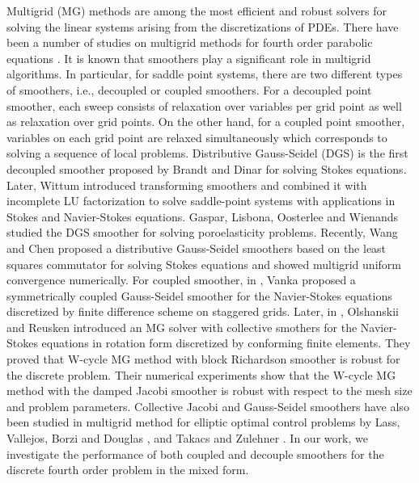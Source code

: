 \documentclass[smallcondensed]{svjour3}
\numberwithin{equation}{section} \numberwithin{table}{section}
\numberwithin{figure}{section}
\numberwithin{algorithm}{section}
\begin{document}
Multigrid (MG) methods are among the most efficient and robust solvers for solving the linear systems arising from the discretizations of PDEs. There have been a number of studies on multigrid methods for fourth order parabolic equations \cite{kay2006multigrid,Kim2004,wise2007solving,banas2009multigrid,henn2005multigrid}. 
It is known that smoothers play a significant role in multigrid algorithms. In particular, for saddle point systems, there are two different types of smoothers, i.e., decoupled or coupled smoothers. For a decoupled point smoother, each sweep consists of relaxation over variables per grid point as well as relaxation over grid points. On the other hand, for a coupled point smoother, variables on each grid point are relaxed simultaneously which corresponds to solving a sequence of local problems. Distributive Gauss-Seidel (DGS) is the first decoupled smoother proposed by Brandt and Dinar \cite{brandt1979multi} for solving Stokes equations. Later, Wittum \cite{wittum1999multigrid} introduced transforming smoothers and combined it with incomplete LU factorization to solve saddle-point systems with applications in Stokes and Navier-Stokes equations. Gaspar, Lisbona, Oosterlee and Wienands \cite{gaspar2004systematic} studied the DGS smoother for solving poroelasticity problems. Recently, Wang and Chen \cite{wang2013multigrid} proposed a distributive Gauss-Seidel smoothers based on the least squares commutator for solving Stokes equations and showed multigrid uniform convergence numerically. 
For coupled smoother, in \cite{Vanka1986block}, Vanka proposed a symmetrically coupled Gauss-Seidel smoother for the Navier-Stokes equations discretized by finite difference scheme on staggered grids. Later, in \cite{Olshanskii2002}, Olshanskii and Reusken introduced an MG solver with collective smothers for the Navier-Stokes equations in rotation form discretized by conforming finite elements. They proved that W-cycle MG method with block Richardson smoother is robust for the discrete problem. Their numerical experiments show that the W-cycle MG method with the damped Jacobi smoother is robust with respect to the mesh size and problem parameters. Collective Jacobi and Gauss-Seidel smoothers have also been studied in multigrid method for elliptic optimal control problems by Lass, Vallejos, Borzi and Douglas \cite{Lass2009}, and Takacs and Zulehner \cite{Takacs2011}. In our work, we investigate the performance of both coupled and decouple smoothers for the discrete fourth order problem in the mixed form. 
\end{document}
